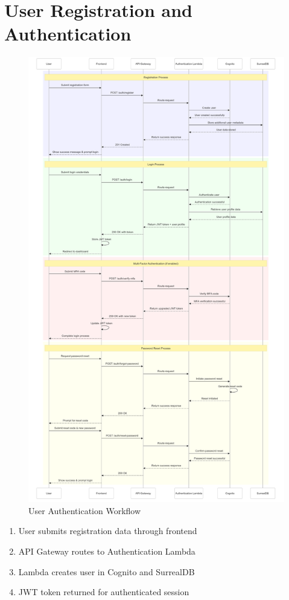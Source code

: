 \documentclass[a4paper, 11pt]{scrreprt}
\begin{document}
\section{User Registration and Authentication}
\begin{figure}[!htb]
    \centering
    \includegraphics[height=0.7\textheight]{user_authentication.png}
    \caption{User Authentication Workflow}
\end{figure}

\begin{enumerate}
    \item User submits registration data through frontend
    \item API Gateway routes to Authentication Lambda
    \item Lambda creates user in Cognito and SurrealDB
    \item JWT token returned for authenticated session
\end{enumerate}
\end{document}
